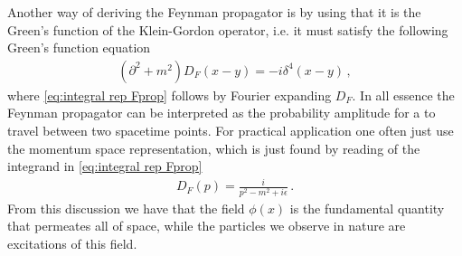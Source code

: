 Another way of deriving the Feynman propagator is by using that it is the Green's function of the Klein-Gordon operator, i.e. it must satisfy the following Green's function equation
\begin{align}\label{eq:scalar Feynman propagator equation}
    (\partial^{2}+m^{2})D_{F}(x-y)=-i\delta^{4}(x-y)\,,
\end{align}
where \cref{eq:integral rep Fprop} follows by Fourier expanding $D_{F}$. In all essence the Feynman propagator can be interpreted as the probability amplitude for a  to travel between two spacetime points. For practical application one often just use the momentum space representation, which is just found by reading of the integrand in \cref{eq:integral rep Fprop}
\begin{align}
    D_{F}(p)=\frac{i}{p^{2}-m^{2}+i\epsilon}\,.
\end{align}
From this discussion we have that the field $\phi(x)$ is the fundamental quantity that permeates all of space, while the particles we observe in nature are excitations of this field. 

